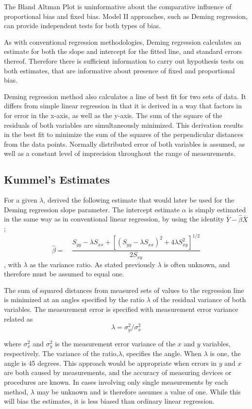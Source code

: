 \documentclass[12pt, a4paper]{report}
\theoremstyle{plain}
\theoremstyle{definition}
\theoremstyle{remark}
\begin{document}
	The Bland Altman Plot is uninformative about the comparative influence of proportional bias and fixed bias. Model II approaches, such as Deming regression,  can provide independent tests for
	both types of bias.

As with conventional regression methodologies, Deming regression calculates an estimate for both the slope and intercept for the
fitted line, and standard errors thereof. Therefore there is sufficient information to carry out hypothesis tests on both
estimates, that are informative about presence of fixed and proportional bias.

Deming regression method also calculates a line of best fit for two sets of data. It differs from simple linear regression in that it is derived in a way that factors in for error in the x-axis, as well as the y-axis. The sum of the square of the residuals of both variables are simultaneously minimized. This derivation results in the best fit to minimize the sum of the squares of the perpendicular distances from the data points. Normally distributed error of both variables is assumed, as well as a constant level of imprecision throughout the range of measurements.


\subsection{Kummel's Estimates}


For a given $\lambda$, \citet{Kummel} derived the following estimate that would later be used for the Deming regression slope
parameter. The intercept estimate $\alpha$ is simply estimated in the same way as in conventional linear
regression, by using the identity $\bar{Y}-\hat{\beta}\bar{X}$;
\begin{equation}
\hat{\beta} =\quad \frac{S_{yy} - \lambda S_{xx}+[(S_{yy} -
	\lambda S_{xx})^{2}+ 4\lambda S^{2}_{xy}]^{1/2}}{2S_{xy}}
\end{equation},
with $\lambda$ as the variance ratio. As stated previously $\lambda$ is often unknown, and therefore must be assumed to equal one. 

The sum of squared distances from measured sets of values to the regression line is minimized at an angles specified by the ratio $\lambda$ of the residual variance of both variables. The measurement error is specified with measurement error variance related as 
\[\lambda = \sigma^2_y/\sigma^2_x\]

where $\sigma^2_x$ and $\sigma^2_y$ is the measurement error variance of the $x$ and $y$ variables, respectively.
The variance of the ratio,$\lambda$, specifies the angle.  When $\lambda$ is one, the angle is 45 degrees. 
This approach would be appropriate when errors in $y$ and $x$ are both caused by measurements, and the accuracy of measuring devices or procedures are known. In cases involving only single measurements by each method, $\lambda$ may be unknown and is therefore assumes a value of one. While this will bias the estimates, it is less biased than ordinary linear regression.
\end{document}
